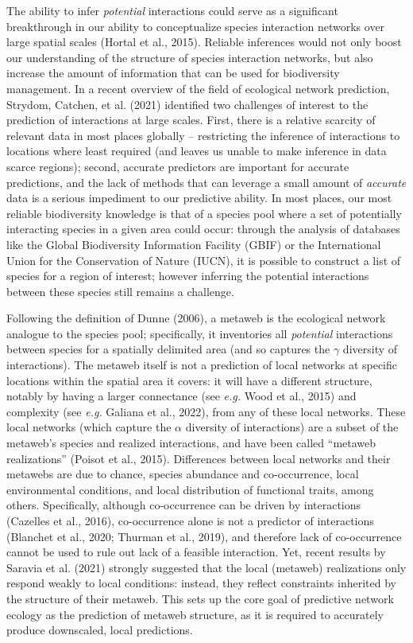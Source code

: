 \documentclass[11pt]{article}
\begin{document}
The ability to infer \emph{potential} interactions could serve as a
significant breakthrough in our ability to conceptualize species
interaction networks over large spatial scales (Hortal et al., 2015).
Reliable inferences would not only boost our understanding of the
structure of species interaction networks, but also increase the amount
of information that can be used for biodiversity management. In a recent
overview of the field of ecological network prediction, Strydom,
Catchen, et al. (2021) identified two challenges of interest to the
prediction of interactions at large scales. First, there is a relative
scarcity of relevant data in most places globally -- restricting the
inference of interactions to locations where least required (and leaves
us unable to make inference in data scarce regions); second, accurate
predictors are important for accurate predictions, and the lack of
methods that can leverage a small amount of \emph{accurate} data is a
serious impediment to our predictive ability. In most places, our most
reliable biodiversity knowledge is that of a species pool where a set of
potentially interacting species in a given area could occur: through the
analysis of databases like the Global Biodiversity Information Facility
(GBIF) or the International Union for the Conservation of Nature (IUCN),
it is possible to construct a list of species for a region of interest;
however inferring the potential interactions between these species still
remains a challenge.

Following the definition of Dunne (2006), a metaweb is the ecological
network analogue to the species pool; specifically, it inventories all
\emph{potential} interactions between species for a spatially delimited
area (and so captures the \(\gamma\) diversity of interactions). The
metaweb itself is not a prediction of local networks at specific
locations within the spatial area it covers: it will have a different
structure, notably by having a larger connectance (see \emph{e.g.} Wood
et al., 2015) and complexity (see \emph{e.g.} Galiana et al., 2022),
from any of these local networks. These local networks (which capture
the \(\alpha\) diversity of interactions) are a subset of the metaweb's
species and realized interactions, and have been called ``metaweb
realizations'' (Poisot et al., 2015). Differences between local networks
and their metawebs are due to chance, species abundance and
co-occurrence, local environmental conditions, and local distribution of
functional traits, among others. Specifically, although co-occurrence
can be driven by interactions (Cazelles et al., 2016), co-occurrence
alone is not a predictor of interactions (Blanchet et al., 2020; Thurman
et al., 2019), and therefore lack of co-occurrence cannot be used to
rule out lack of a feasible interaction. Yet, recent results by Saravia
et al. (2021) strongly suggested that the local (metaweb) realizations
only respond weakly to local conditions: instead, they reflect
constraints inherited by the structure of their metaweb. This sets up
the core goal of predictive network ecology as the prediction of metaweb
structure, as it is required to accurately produce downscaled, local
predictions.
\end{document}
